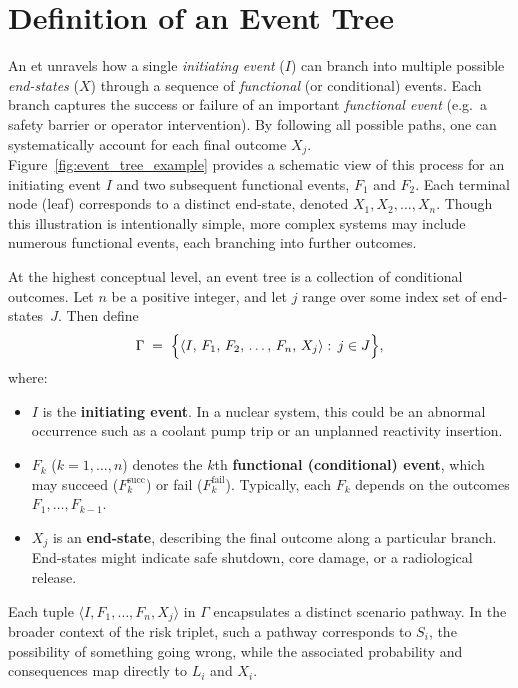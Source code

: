 \section{Definition of an Event Tree}
\label{sec:event_tree_definition}

An \acrfull{et} unravels how a single \emph{initiating event} (\(I\)) can branch into multiple possible \emph{end-states} (\(X\)) through a sequence of \emph{functional} (or conditional) events. Each branch captures the success or failure of an important \emph{functional event} (e.g.\ a safety barrier or operator intervention). By following all possible paths, one can systematically account for each final outcome \(X_j\). Figure~\ref{fig:event_tree_example} provides a schematic view of this process for an initiating event \(I\) and two subsequent functional events, \(F_1\) and \(F_2\). Each terminal node (leaf) corresponds to a distinct end-state, denoted \(X_1, X_2, \ldots, X_n\). Though this illustration is intentionally simple, more complex systems may include numerous functional events, each branching into further outcomes.




At the highest conceptual level, an event tree is a collection of conditional outcomes. Let \(n\) be a positive integer, and let \(j\) range over some index set of end-states~\(J\). Then define
\begin{equation}
\label{eq:event_tree_gamma}
    \Gamma
    \;=\;
    \Bigl\{
        \langle
            I,\,
            F_1,\,
            F_2,\,
            \dots,\,
            F_n,\,
            X_j
        \rangle
        :\,
        j \in J
    \Bigr\},
\end{equation}
where:
\begin{itemize}
    \item \(I\) is the \textbf{initiating event}. In a nuclear system, this could be an abnormal occurrence such as a coolant pump trip or an unplanned reactivity insertion.
    \item \(F_k\) (\(k=1,\ldots,n\)) denotes the \(k\)th \textbf{functional (conditional) event}, which may succeed (\(F_k^{\text{succ}}\)) or fail (\(F_k^{\text{fail}}\)). Typically, each \(F_k\) depends on the outcomes \(F_1,\ldots,F_{k-1}\).
    \item \(X_j\) is an \textbf{end-state}, describing the final outcome along a particular branch. End-states might indicate safe shutdown, core damage, or a radiological release.
\end{itemize}
Each tuple \(\langle I, F_1, \dots, F_n, X_j\rangle\) in \(\Gamma\) encapsulates a distinct scenario pathway. In the broader context of the risk triplet, such a pathway corresponds to \(S_i\), the possibility of something going wrong, while the associated probability and consequences map directly to \(L_i\) and \(X_i\).